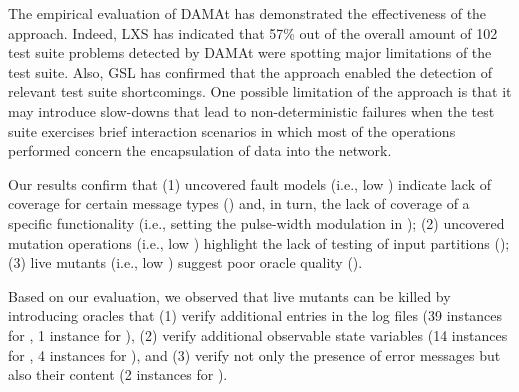 The empirical evaluation of DAMAt has demonstrated the effectiveness of the approach. Indeed, LXS has indicated that 57\% out of the overall amount of 102 test suite problems detected by DAMAt were spotting major limitations of the test suite. Also, GSL has confirmed that the approach enabled the detection of relevant test suite shortcomings.
One possible limitation of the approach is that it may introduce slow-downs that lead to non-deterministic failures when the test suite exercises brief interaction scenarios in which most of the operations performed concern the encapsulation of data into the network.

Our results confirm that (1) uncovered fault models (i.e., low ) indicate lack of coverage for certain message types () and, in turn, the lack of coverage of a specific functionality (i.e., setting the pulse-width modulation in \ADCS); (2) uncovered mutation operations (i.e., low ) highlight the lack of testing of input partitions (); (3) live mutants (i.e., low ) suggest poor oracle quality ().

Based on our evaluation, we observed that live mutants can be killed by introducing oracles that (1) verify additional entries in the log files (39 instances for \ADCS, 1 instance for \GPS), (2) verify additional observable state variables (14 instances for \ADCS, 4 instances for \PARAM), and (3) verify not only the presence of error messages but also their content (2 instances for \ADCS).


